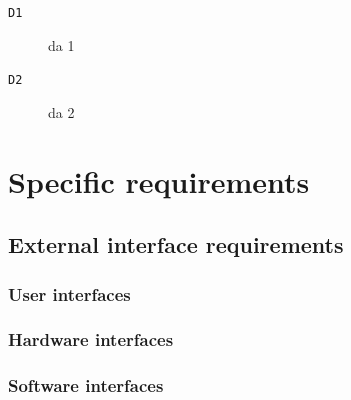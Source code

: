 \documentclass[12pt]{article}
\begin{document}
      \begin{description}
        \item[\texttt{D1}] da 1
        \item[\texttt{D2}] da 2
      \end{description}


\clearpage
\section{Specific requirements}
\label{sec:specreq}


  \subsection{External interface requirements}
    \subsubsection{User interfaces}
    \subsubsection{Hardware interfaces}
    \subsubsection{Software interfaces}
\end{document}
